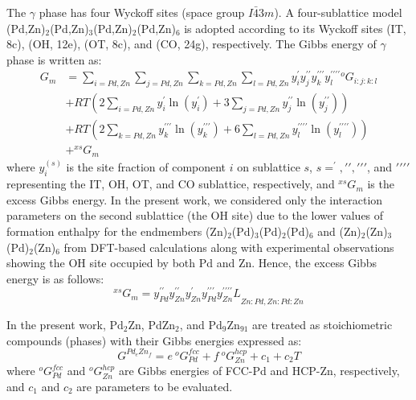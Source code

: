 The $\gamma$ phase has four Wyckoff sites (space group $I\bar{4}3m$). A four-sublattice model \\ (Pd,Zn)$_2$(Pd,Zn)$_3$(Pd,Zn)$_2$(Pd,Zn)$_6$ is adopted according to its Wyckoff sites (IT, 8c), (OH, 12e), (OT, 8c), and (CO, 24g), respectively. The Gibbs energy of $\gamma$ phase is written as: 
\begin{equation} \label{intermetallics:gammaG}
    \begin{aligned}
    G_m&=\sum_{i=Pd,Zn}\sum_{j=Pd,Zn}\sum_{k=Pd,Zn}\sum_{l=Pd,Zn}{y_i^\prime y_j^{\prime\prime}y_k^{\prime\prime\prime}y_l^{\prime\prime\prime\prime}{{^o}G}_{i:j:k:l}}\\&+RT\left(2\sum_{i=Pd,Zn}{y_i^{\prime}\ln{\left(y_i^{\prime}\right)}}+3\sum_{j=Pd,Zn}{y_j^{\prime\prime}\ln{\left(y_j^{\prime\prime}\right)}}\right)\\&+RT\left(2\sum_{k=Pd,Zn}{y_k^{\prime\prime\prime}\ln{\left(y_k^{\prime\prime\prime}\right)}}+6\sum_{l=Pd,Zn}{y_l^{\prime\prime\prime\prime}\ln{\left(y_l^{\prime\prime\prime\prime}\right)}}\right)\\&+{^{xs}}G_m
    \end{aligned}
\end{equation}
where $y_i^{(s)}$ is the site fraction of component $i$ on sublattice $s$, $s=^\prime, \prime\prime, \prime\prime\prime$, and $\prime\prime\prime\prime$ representing the IT, OH, OT, and CO sublattice, respectively, and ${^{xs}}G_m$ is the excess Gibbs energy. In the present work, we considered only the interaction parameters on the second sublattice (the OH site) due to the lower values of formation enthalpy for the endmembers (Zn)$_2$(Pd)$_3$(Pd)$_2$(Pd)$_6$ and (Zn)$_2$(Zn)$_3$(Pd)$_2$(Zn)$_6$ from DFT-based calculations along with experimental observations \cite{strom1969x, gourdon2006intergrowth} showing the OH site occupied by both Pd and Zn. Hence, the excess Gibbs energy is as follows:
\begin{equation} \label{intermetallics:gammaGex}
    {^{xs}}G_m=y_{Pd}^{\prime\prime}y_{Zn}^{\prime\prime}y_{Zn}^\prime y_{Pd}^{\prime\prime\prime}{y_{Zn}^{\prime\prime\prime\prime}L}_{Zn:Pd,Zn:Pd:Zn}
\end{equation}

In the present work, Pd$_2$Zn, PdZn$_2$, and Pd$_9$Zn$_{91}$ are treated as stoichiometric compounds (phases) with their Gibbs energies expressed as:
\begin{equation} \label{intermetallics:stoiG}
    G^{{Pd}_e{Zn}_f}=e\:{^o}G_{Pd}^{fcc}+f\:{^o}G_{Zn}^{hcp}+c_1+c_2T
\end{equation}
where ${^o}G_{Pd}^{fcc}$ and ${^o}G_{Zn}^{hcp}$ are Gibbs energies of FCC-Pd and HCP-Zn, respectively, and $c_1$ and $c_2$ are parameters to be evaluated.


